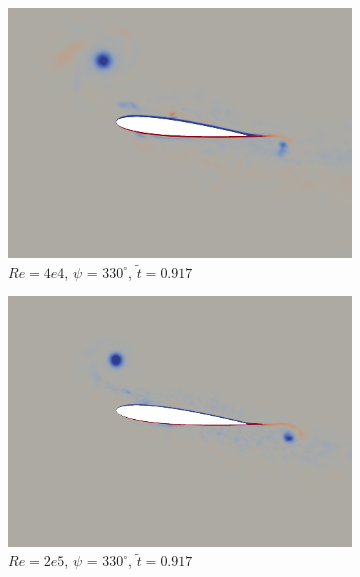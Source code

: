 \begin{figure}[H]
	\begin{subfigure}[b]{0.32\textwidth}
		\centering
		\includegraphics[width=1\textwidth]{figures/Vorticity_plots/Re_40k_1pt2/phase_330.png}
		\caption{$Re=4e4$, $\psi$ = $330^\circ$, $\tilde{t}=0.917$}
		\label{fig:Re_40k_1pt2_phi330}
	\end{subfigure}
	\begin{subfigure}[b]{0.32\textwidth}
		\centering
		\includegraphics[width=1\textwidth]{figures/Vorticity_plots/Re_200k_1pt2/phase_330.png}
		\caption{$Re=2e5$, $\psi$ = $330^\circ$, $\tilde{t}=0.917$}
		\label{fig:Re_200k_1pt2_phi330}
	\end{subfigure}
	\begin{subfigure}[b]{0.32\textwidth}
		\centering

\end{subfigure}
\end{figure}
